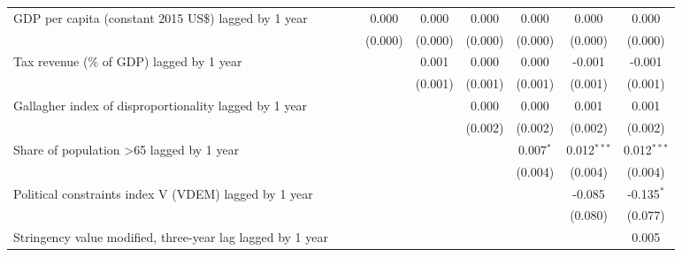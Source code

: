 \begin{tabular}{lcccccccc}
   GDP per capita (constant 2015 US\$) lagged by 1 year       &                &                & 0.000          & 0.000          & 0.000          & 0.000          & 0.000          & 0.000\\   
                                                              &                &                & (0.000)        & (0.000)        & (0.000)        & (0.000)        & (0.000)        & (0.000)\\   
   Tax revenue (\% of GDP) lagged by 1 year                   &                &                &                & 0.001          & 0.000          & 0.000          & -0.001         & -0.001\\   
                                                              &                &                &                & (0.001)        & (0.001)        & (0.001)        & (0.001)        & (0.001)\\   
   Gallagher index of disproportionality lagged by 1 year     &                &                &                &                & 0.000          & 0.000          & 0.001          & 0.001\\   
                                                              &                &                &                &                & (0.002)        & (0.002)        & (0.002)        & (0.002)\\   
   Share of population >65 lagged by 1 year                   &                &                &                &                &                & 0.007$^{*}$    & 0.012$^{***}$  & 0.012$^{***}$\\   
                                                              &                &                &                &                &                & (0.004)        & (0.004)        & (0.004)\\   
   Political constraints index V (VDEM) lagged by 1 year      &                &                &                &                &                &                & -0.085         & -0.135$^{*}$\\   
                                                              &                &                &                &                &                &                & (0.080)        & (0.077)\\   
   Stringency value modified, three-year lag lagged by 1 year &                &                &                &                &                &                &                & 0.005\\   

\end{tabular}
